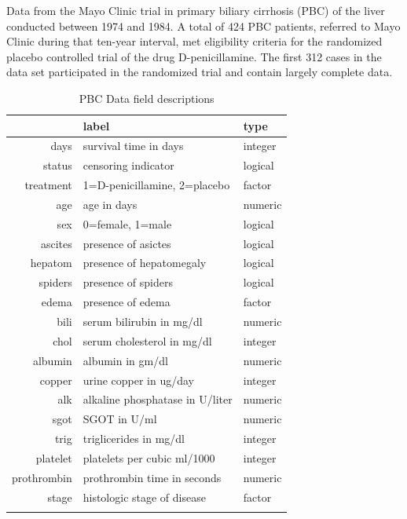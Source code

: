 \documentclass[nojss]{jss}
\begin{document}
Data from the Mayo Clinic trial in primary biliary cirrhosis (PBC) of the liver conducted between 1974 and 1984. A total of 424 PBC patients, referred to Mayo Clinic during that ten-year interval, met eligibility criteria for the randomized placebo controlled trial of the drug D-penicillamine. The first 312 cases in the data set participated in the randomized trial and contain largely complete data.



\begin{table}[ht]
\centering
{\footnotesize
\begin{tabular}{rll}
  \toprule
 & label & type \\ 
  \midrule
days & survival time in days & integer \\ 
   \rowcolor[gray]{0.95}status & censoring indicator & logical \\ 
  treatment & 1=D-penicillamine, 2=placebo & factor \\ 
   \rowcolor[gray]{0.95}age & age in days & numeric \\ 
  sex & 0=female, 1=male & logical \\ 
   \rowcolor[gray]{0.95}ascites & presence of asictes & logical \\ 
  hepatom & presence of hepatomegaly & logical \\ 
   \rowcolor[gray]{0.95}spiders & presence of spiders & logical \\ 
  edema & presence of edema & factor \\ 
   \rowcolor[gray]{0.95}bili & serum bilirubin in mg/dl & numeric \\ 
  chol & serum cholesterol in mg/dl & integer \\ 
   \rowcolor[gray]{0.95}albumin & albumin in gm/dl & numeric \\ 
  copper & urine copper in ug/day & integer \\ 
   \rowcolor[gray]{0.95}alk & alkaline phosphatase in U/liter & numeric \\ 
  sgot & SGOT in U/ml & numeric \\ 
   \rowcolor[gray]{0.95}trig & triglicerides in mg/dl & integer \\ 
  platelet & platelets per cubic ml/1000 & integer \\ 
   \rowcolor[gray]{0.95}prothrombin & prothrombin time in seconds & numeric \\ 
  stage & histologic stage of disease & factor \\ 
   \rowcolor[gray]{0.95} \bottomrule
\end{tabular}
}
\caption{PBC Data field descriptions} 
\label{T:dataLabs}
\end{table}
\end{document}
